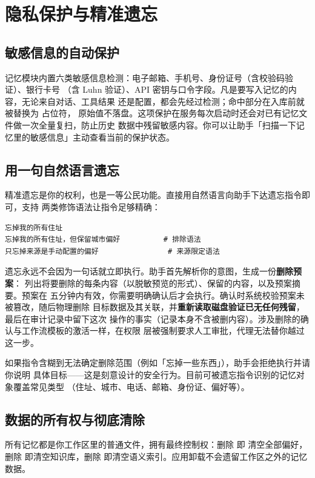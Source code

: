 \section{隐私保护与精准遗忘}\label{sec:forget}

\subsection{敏感信息的自动保护}

记忆模块内置六类敏感信息检测：电子邮箱、手机号、身份证号（含校验码验证）、银行卡号
（含 Luhn 验证）、API 密钥与口令字段。凡是要写入记忆的内容，无论来自对话、工具结果
还是配置，都会先经过检测；命中部分在入库前就被替换为 \code{[REDACTED:类型]} 占位符，
原始值不落盘。这项保护在服务每次启动时还会对已有记忆文件做一次全量复扫，防止历史
数据中残留敏感内容。你可以让助手「扫描一下记忆里的敏感信息」主动查看当前的保护状态。

\subsection{用一句自然语言遗忘}

精准遗忘是你的权利，也是一等公民功能。直接用自然语言向助手下达遗忘指令即可，支持
两类修饰语法让指令足够精确：

\begin{lstlisting}[language={}]
忘掉我的所有住址
忘掉我的所有住址，但保留城市偏好          # 排除语法
只忘掉来源是手动配置的偏好                # 来源限定语法
\end{lstlisting}

遗忘永远不会因为一句话就立即执行。助手首先解析你的意图，生成一份\textbf{删除预案}：
列出将要删除的每条内容（以脱敏预览的形式）、保留的内容，以及预案摘要。预案在
五分钟内有效，你需要明确确认后才会执行。确认时系统校验预案未被篡改，随后物理删除
目标数据及其关联，并\textbf{重新读取磁盘验证已无任何残留}，最后在审计记录中留下这次
操作的事实（记录本身不含被删内容）。涉及删除的确认与工作流模板的激活一样，在权限
层被强制要求人工审批，代理无法替你越过这一步。

如果指令含糊到无法确定删除范围（例如「忘掉一些东西」），助手会拒绝执行并请你说明
具体目标——这是刻意设计的安全行为。目前可被遗忘指令识别的记忆对象覆盖常见类型
（住址、城市、电话、邮箱、身份证、偏好等）。

\subsection{数据的所有权与彻底清除}

所有记忆都是你工作区里的普通文件，拥有最终控制权：删除  即
清空全部偏好，删除  即清空知识库，删除 
即清空语义索引。应用卸载不会遗留工作区之外的记忆数据。
